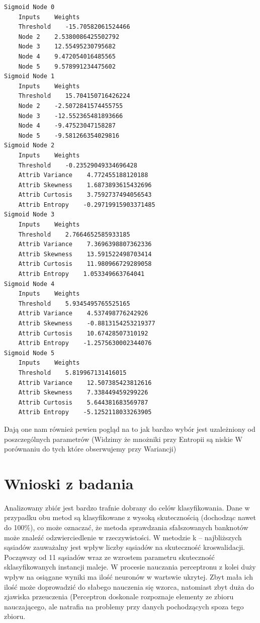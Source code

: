 \documentclass{classrep}
\begin{document}
\scriptsize
\begin{verbatim}
Sigmoid Node 0
    Inputs    Weights
    Threshold    -15.70582061524466
    Node 2    2.5380086425502792
    Node 3    12.55495230795682
    Node 4    9.472054016485565
    Node 5    9.578991234475602
Sigmoid Node 1
    Inputs    Weights
    Threshold    15.704150716426224
    Node 2    -2.5072841574455755
    Node 3    -12.552365481893666
    Node 4    -9.47523047158287
    Node 5    -9.581266354029816
Sigmoid Node 2
    Inputs    Weights
    Threshold    -0.23529049334696428
    Attrib Variance    4.772455188120188
    Attrib Skewness    1.6873893615432696
    Attrib Curtosis    3.7592737494056543
    Attrib Entropy    -0.29719915903371485
Sigmoid Node 3
    Inputs    Weights
    Threshold    2.7664652585933185
    Attrib Variance    7.3696398807362336
    Attrib Skewness    13.591522498703414
    Attrib Curtosis    11.980966729289058
    Attrib Entropy    1.053349663764041
Sigmoid Node 4
    Inputs    Weights
    Threshold    5.9345495765525165
    Attrib Variance    4.537498776242926
    Attrib Skewness    -0.8813154253219377
    Attrib Curtosis    10.67428507310192
    Attrib Entropy    -1.2575630002344076
Sigmoid Node 5
    Inputs    Weights
    Threshold    5.819967131416015
    Attrib Variance    12.507385423812616
    Attrib Skewness    7.338449459299226
    Attrib Curtosis    5.644381683569787
    Attrib Entropy    -5.1252118033263905
\end{verbatim}
\normalsize

Dają one nam również pewien pogląd na to jak bardzo wybór jest uzależniony od poszczególnych parametrów (Widzimy że mnożniki przy Entropii są niskie W porównaniu do tych które obserwujemy przy Wariancji)

\section{Wnioski z badania}
Analizowany zbiór jest bardzo trafnie dobrany do celów klasyfikowania. Dane w przypadku obu metod są klasyfikowane z wysoką skutecznością (dochodząc nawet do 100\%), co może oznaczać, że metoda sprawdzania sfałszowanych banknotów może znaleźć odzwierciedlenie w rzeczywistości. W metodzie k – najbliższych sąsiadów zauważalny jest wpływ liczby sąsiadów na skuteczność kroswalidacji. Począwszy od 11 sąsiadów wraz ze wzrostem parametru skuteczność sklasyfikowanych instancji maleje. W procesie nauczania perceptronu z kolei duży wpływ na osiągane wyniki ma ilość neuronów w wartswie ukrytej. Zbyt mała ich ilość może doprowadzić do słabego nauczenia się wzorca, natomiast zbyt duża do zjawiska przeuczenia (Perceptron doskonale rozpoznaje elementy ze zbioru nauczającego, ale natrafia na problemy przy danych pochodzących spoza tego zbioru.
\end{document}
